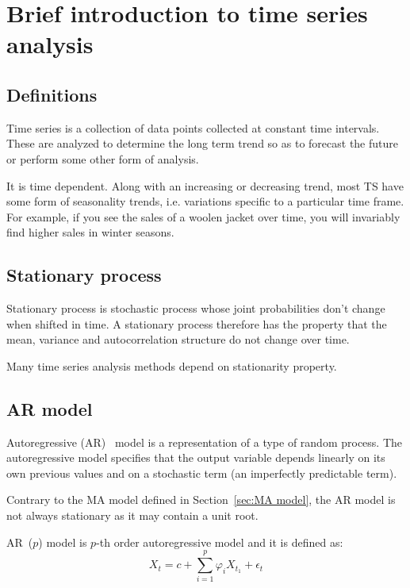 
\chapter{Brief introduction to time series analysis}
\label{chap:Brief introduction to time series analysis}

\section{Definitions}
\label{sec:Definitions}

Time series is a collection of data points collected at constant time intervals. These are analyzed to determine the long term trend so as to forecast the future or perform some other form of analysis.

It is time dependent. Along with an increasing or decreasing trend, most TS have some form of seasonality trends, i.e. variations specific to a particular time frame. For example, if you see the sales of a woolen jacket over time, you will invariably find higher sales in winter seasons.

\section{Stationary process}
\label{sec:Stationary process}

Stationary process is stochastic process whose joint probabilities don't change when shifted in time. A stationary process therefore has the property that the mean, variance and autocorrelation structure do not change over time.

Many time series analysis methods depend on stationarity property.

\section{AR model}
\label{sec:AR model}

Autoregressive (AR)~\autocite{tsa} model is a representation of a type of random process. The autoregressive model specifies that the output variable depends linearly on its own previous values and on a stochastic term (an imperfectly predictable term).

Contrary to the MA model defined in Section~\ref{sec:MA model}, the AR model is not always stationary as it may contain a unit root.

AR~($p$) model is $p$-th order autoregressive model and it is defined as:
\begin{equation*}
  X_t = c + \sum_{i=1}^p{\varphi_i X_{t_1}} + \epsilon_t
\end{equation*}

